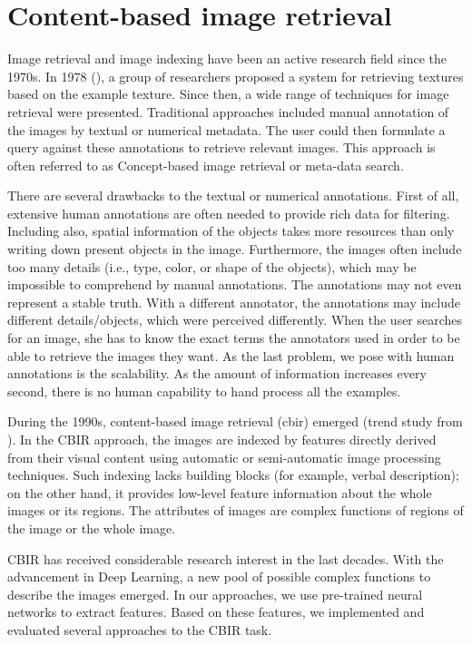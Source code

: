 \chapter{Content-based image retrieval}
\label{ch:preliminaries}

Image retrieval and image indexing have been an active research field since the 1970s. In 1978 (\cite{tamura1978textural}), a group of researchers proposed a system for retrieving textures based on the example texture. Since then, a wide range of techniques for image retrieval were presented. Traditional approaches included manual annotation of the images by textual or numerical metadata. The user could then formulate a query against these annotations to retrieve relevant images. This approach is often referred to as Concept-based image retrieval or meta-data search.

There are several drawbacks to the textual or numerical annotations. First of all, extensive human annotations are often needed to provide rich data for filtering. Including also, spatial information of the objects takes more resources than only writing down present objects in the image. Furthermore, the images often include too many details (i.e., type, color, or shape of the objects), which may be impossible to comprehend by manual annotations.  The annotations may not even represent a stable truth. With a different annotator, the annotations may include different details/objects, which were perceived differently. When the user searches for an image, she has to know the exact terms the annotators used in order to be able to retrieve the images they want. As the last problem, we pose with human annotations is the scalability. As the amount of information increases every second, there is no human capability to hand process all the examples.

During the 1990s, content-based image retrieval (\acrshort{cbir}) emerged (trend study from \cite{datta2008image}). In the CBIR approach, the images are indexed by features directly derived from their visual content using automatic or semi-automatic image processing techniques. Such indexing lacks building blocks (for example, verbal description); on the other hand, it provides low-level feature information about the whole images or its regions. The attributes of images are complex functions of regions of the image or the whole image.

CBIR has received considerable research interest in the last decades. With the advancement in Deep Learning, a new pool of possible complex functions to describe the images emerged. In our approaches, we use pre-trained neural networks to extract features. Based on these features, we implemented and evaluated several approaches to the CBIR task.

